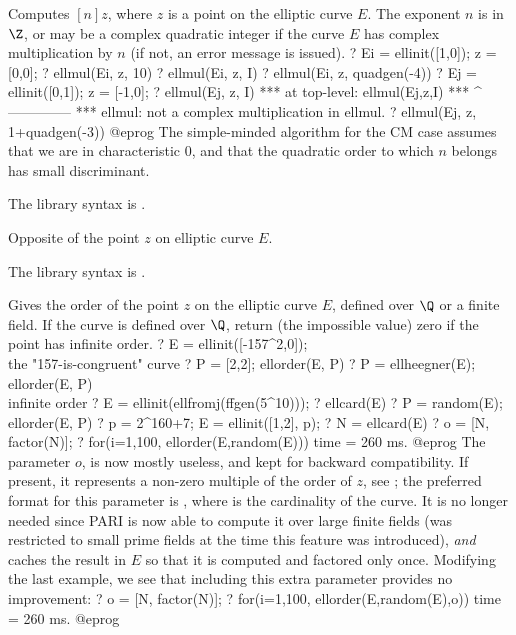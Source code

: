 \label{se:ellmul}
Computes $[n]z$, where $z$ is a point on the elliptic curve $E$. The
exponent $n$ is in $\Z$, or may be a complex quadratic integer if the curve $E$
has complex multiplication by $n$ (if not, an error message is issued).
\bprog
? Ei = ellinit([1,0]); z = [0,0];
? ellmul(Ei, z, 10)
? ellmul(Ei, z, I)
? ellmul(Ei, z, quadgen(-4))
? Ej  = ellinit([0,1]); z = [-1,0];
? ellmul(Ej, z, I)
  ***   at top-level: ellmul(Ej,z,I)
  ***                 ^--------------
  *** ellmul: not a complex multiplication in ellmul.
? ellmul(Ej, z, 1+quadgen(-3))
@eprog
The simple-minded algorithm for the CM case assumes that we are in
characteristic $0$, and that the quadratic order to which $n$ belongs has
small discriminant.

The library syntax is .

\label{se:ellneg}
Opposite of the point $z$ on elliptic curve $E$.

The library syntax is .

\label{se:ellorder}
Gives the order of the point $z$ on the elliptic
curve $E$, defined over $\Q$ or a finite field.
If the curve is defined over $\Q$, return (the impossible value) zero if the
point has infinite order.
\bprog
? E = ellinit([-157^2,0]);  \\ the "157-is-congruent" curve
? P = [2,2]; ellorder(E, P)
? P = ellheegner(E); ellorder(E, P) \\ infinite order
? E = ellinit(ellfromj(ffgen(5^10)));
? ellcard(E)
? P = random(E); ellorder(E, P)
? p = 2^160+7; E = ellinit([1,2], p);
? N = ellcard(E)
? o = [N, factor(N)];
? for(i=1,100, ellorder(E,random(E)))
time = 260 ms.
@eprog
The parameter $o$, is now mostly useless, and kept for backward
compatibility. If present, it represents a non-zero multiple of the order
of $z$, see ; the preferred format for this parameter is
, where  is the cardinality of the curve.
It is no longer needed since PARI is now able to compute it over large
finite fields (was restricted to small prime fields at the time this feature
was introduced), \emph{and} caches the result in $E$ so that it is computed
and factored only once. Modifying the last example, we see that including
this extra parameter provides no improvement:
\bprog
? o = [N, factor(N)];
? for(i=1,100, ellorder(E,random(E),o))
time = 260 ms.
@eprog

